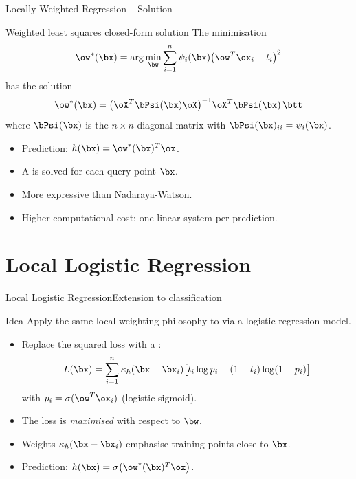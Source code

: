 \begin{frame}{Locally Weighted Regression -- Solution}{}
  \begin{block}{Weighted least squares closed-form solution}
    The minimisation
    \[
      \ow^*(\bx)=\arg\min_{\bw}\sum_{i=1}^n\psi_i(\bx)\bigl(\ow^T\ox_i-t_i\bigr)^2
    \]
    has the solution
    \[
      \ow^*(\bx)=\bigl(\oX^T\bPsi(\bx)\oX\bigr)^{-1}\oX^T\bPsi(\bx)\,\btt
    \]
    where $\bPsi(\bx)$ is the $n\times n$ diagonal matrix with $\bPsi(\bx)_{ii}=\psi_i(\bx)$.
  \end{block}

  \medskip
  \begin{itemize}
    \item Prediction: $h(\bx)=\ow^*(\bx)^T\ox$.
    \item A  is solved for each query point $\bx$.
    \item More expressive than Nadaraya-Watson.
    \item Higher computational cost: one linear system per prediction.
  \end{itemize}
\end{frame}

\section{Local Logistic Regression}

\begin{frame}{Local Logistic Regression}{Extension to classification}
  \begin{block}{Idea}
    Apply the same local-weighting philosophy to 
    via a logistic regression model.
  \end{block}

  \medskip
  \begin{itemize}
    \item Replace the squared loss with a :
      \[
        L(\bx)=\sum_{i=1}^n\kappa_h(\bx-\bx_i)
               \bigl[t_i\log p_i-(1-t_i)\log(1-p_i)\bigr]
      \]
      with $p_i=\sigma(\ow^T\ox_i)$ (logistic sigmoid).
    \item The loss is \emph{maximised} with respect to $\bw$.
    \item Weights $\kappa_h(\bx-\bx_i)$ emphasise training points close to $\bx$.
    \item Prediction: $h(\bx)=\sigma\bigl(\ow^*(\bx)^T\ox\bigr)$.
  \end{itemize}
\end{frame}

